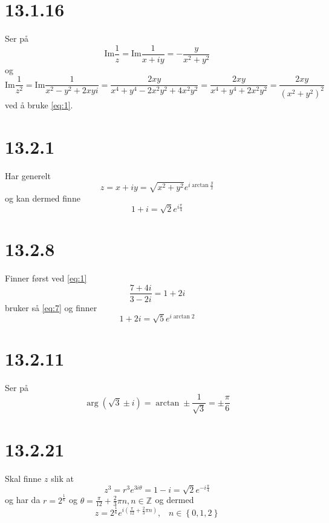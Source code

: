 \documentclass{report}
\newcommand{\M}[2]{\mathbb{#1}^{#2}}
\newcommand{\nbrack}[1]{\left( #1 \right)}
\newcommand{\cbrack}[1]{\left\lbrace #1 \right\rbrace}
\newcommand{\im}{\text{Im}}
\begin{document}
\section*{13.1.16}
Ser på
\begin{equation}
  \label{eq:5}
  \im \frac{1}{z} = \im \frac{1}{x + iy} = -\frac{y}{x^{2} + y^{2}}
\end{equation}
og
\begin{equation}
  \label{eq:6}
  \im \frac{1}{z^{2}} = \im \frac{1}{x^{2} - y^{2} + 2xyi} = \frac{2xy}{x^{4} + y^{4} - 2x^{2}y^{2} + 4x^{2}y^{2}} = \frac{2xy}{x^{4} + y^{4} + 2 x^{2}y^{2}} = \frac{2xy}{\nbrack{ x^{2} + y^{2} }^{2}}
\end{equation}
ved å bruke \eqref{eq:1}.


\section*{13.2.1}
Har generelt
\begin{equation}
  \label{eq:7}
  z = x + iy = \sqrt{x^{2} + y^{2}} e^{i\arctan \frac{y}{x}}
\end{equation}
og kan dermed finne
\begin{equation}
  \label{eq:8}
  1 + i = \sqrt{2} e^{i\frac{\pi}{4}}
\end{equation}


\section*{13.2.8}
Finner først ved \eqref{eq:1}
\begin{equation}
  \label{eq:10}
  \frac{7+4i}{3-2i} = 1 + 2i
\end{equation}
bruker så \eqref{eq:7} og finner
\begin{equation}
  \label{eq:9}
  1 + 2i = \sqrt{5} e^{i\arctan 2}
\end{equation}


\section*{13.2.11}
Ser på
\begin{equation}
  \label{eq:11}
  \arg \nbrack{\sqrt{3} \pm i} = \arctan \pm\frac{1}{\sqrt{3}} = \pm \frac{\pi}{6}
\end{equation}



\section*{13.2.21}
Skal finne $z$ slik at
\begin{equation}
  \label{eq:12}
  z^{3} = r^{3} e^{3i\theta} = 1 - i = \sqrt{2} e^{-i\frac{\pi}{4}}
\end{equation}
og har da $r=2^{\frac{1}{6}}$ og $\theta = \frac{\pi}{12} + \frac{2}{3}\pi n, n\in\M{Z}{}$ og dermed
\begin{equation}
  \label{eq:13}
  z = 2^{\frac{1}{6}} e^{i\nbrack{ \frac{\pi}{12} + \frac{2}{3}\pi n }}, \;\;\; n \in \cbrack{0, 1, 2}
\end{equation}
\end{document}
